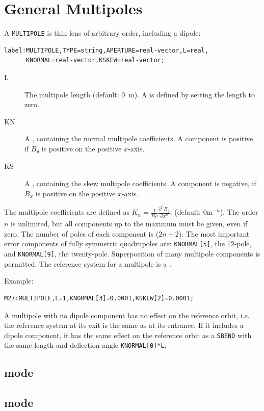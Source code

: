 \section{General Multipoles}
\label{sec:multipole}
A \texttt{MULTIPOLE} is thin lens of arbitrary order, including a dipole:
\begin{verbatim}
label:MULTIPOLE,TYPE=string,APERTURE=real-vector,L=real,
      KNORMAL=real-vector,KSKEW=real-vector;
\end{verbatim}
\begin{description}
\item[L]
  The multipole length (default: 0~m).
  A  is defined by setting the length to zero.
\item[KN]
  A ,
  containing the normal multipole coefficients.
  A component is positive, if $B_y$ is positive on the positive $x$-axis.
\item[KS]
  A ,
  containing the skew multipole coefficients.
  A component is negative, if $B_x$ is positive on the positive $x$-axis.
\end{description}
The multipole coefficients are defined as
$K_{n} = \frac{1}{B \rho}\frac{\partial^n B_y}{\partial x^n}$.
(default: $0 \mathrm{m}^{-n}$).
The order $n$ is unlimited,
but all components up to the maximum must be given, even if zero.
The number of poles of each component is ($2 n + 2$).
The most important error components of fully symmetric quadrupoles are:
\texttt{KNORMAL[5]}, the 12-pole, and \texttt{KNORMAL[9]}, 
the twenty-pole.
Superposition of many multipole components is permitted.
The reference system for a multipole is a 
.

\noindent Example:
\begin{verbatim}
M27:MULTIPOLE,L=1,KNORMAL[3]=0.0001,KSKEW[2]=0.0001;
\end{verbatim}
A multipole with no dipole component has no effect on the reference orbit,
i.e. the reference system at its exit is the same as at its entrance.
If it includes a dipole component,
it has the same effect on the reference orbit as a \texttt{SBEND}
with the same length and deflection angle \texttt{KNORMAL[0]*L}.
\subsection{\opalt mode}

\subsection{\opalcycl mode}


